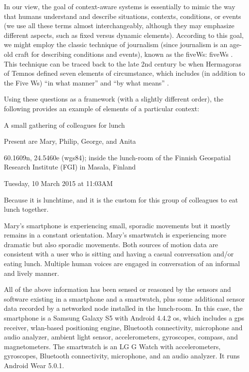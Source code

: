 In our view, the goal of context-aware systems is essentially to mimic the way that humans understand and describe situations, contexts, conditions, or events (we use all these terms almost interchangeably, although they may emphasize different aspects, such as fixed versus dynamic elements). According to this goal, we might employ the classic technique of journalism (since journalism is an age-old craft for describing conditions and events), known as the \acrshort{fiveWs}: \acrlong{fiveWs} . This technique can be traced back to the late 2nd century \acrshort{bc} when Hermagoras of Temnos defined seven elements of circumstance, which includes (in addition to the Five Ws) ``in what manner'' and ``by what means'' \cite{bennett2005hermagoras}.

Using these questions as a framework (with a slightly different order), the following provides an example of elements of a particular context:
%
\begin{bold_description}
\item[What:]A small gathering of colleagues for lunch
\item[Who:] Present are Mary, Philip, George, and Anita
\item[Where:]60.1609\textdegree{}\acrshort{n}, 24.5460\textdegree{}\acrshort{e} (\acrshort{wgs84}); inside the lunch-room of the Finnish Geospatial Research Institute (FGI) in Masala, Finland
\item[When:]Tuesday, 10 March 2015 at 11:03AM
\item[Why:]Because it is lunchtime, and it is the custom for this group of colleagues to eat lunch together.
\item[In What Manner:] Mary's smartphone is experiencing small, sporadic movements but it mostly remains in a constant orientation. Mary's smartwatch is experiencing more dramatic but also sporadic movements. Both sources of motion data are consistent with a user who is sitting and having a casual conversation and/or eating lunch. Multiple human voices are engaged in conversation of an informal and lively manner.
\item[By What Means:]All of the above information has been sensed or reasoned by the sensors and software existing in a smartphone and a smartwatch, plus some additional sensor data recorded by a networked node installed in the lunch-room. In this case, the smartphone is a Samsung Galaxy S5 with Android 4.4.2 \gls{os}, which includes a \gls{gps} receiver, \acrshort{wlan}-based positioning engine, Bluetooth connectivity, microphone and audio analyzer, ambient light sensor, accelerometers, gyroscopes, compass, and magnetometers. The smartwatch is an LG G Watch with accelerometers, gyroscopes, Bluetooth connectivity, microphone, and an audio analyzer. It runs Android Wear 5.0.1.
\end{bold_description}

